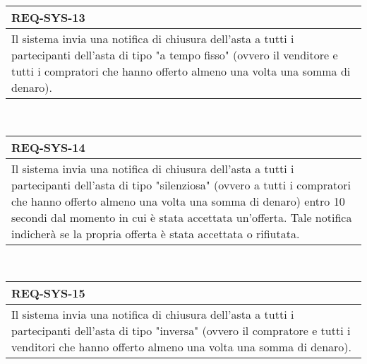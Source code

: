                 \begin{tabular}{|p{}|}
                    \hline
                    \multicolumn{1}{|l|}{\cellcolor{head}\textbf{REQ-SYS-13}} \\
                    \hline
                    Il sistema invia una notifica di chiusura dell'asta a tutti i partecipanti dell'asta di tipo "a tempo fisso" (ovvero il venditore e tutti i compratori che hanno offerto almeno una volta una somma di denaro). \\
                    \hline
                \end{tabular} \smallskip \\
                \begin{tabular}{|p{}|}
                    \hline
                    \multicolumn{1}{|l|}{\cellcolor{head}\textbf{REQ-SYS-14}} \\
                    \hline
                    Il sistema invia una notifica di chiusura dell'asta a tutti i partecipanti dell'asta di tipo "silenziosa" (ovvero a tutti i compratori che hanno offerto almeno una volta una somma di denaro) entro 10 secondi dal momento in cui è stata accettata un'offerta. Tale notifica indicherà se la propria offerta è stata accettata o rifiutata. \\
                    \hline
                \end{tabular} \smallskip \\
                \begin{tabular}{|p{}|}
                    \hline
                    \multicolumn{1}{|l|}{\cellcolor{head}\textbf{REQ-SYS-15}} \\
                    \hline
                    Il sistema invia una notifica di chiusura dell'asta a tutti i partecipanti dell'asta di tipo "inversa" (ovvero il compratore e tutti i venditori che hanno offerto almeno una volta una somma di denaro). \\
                    \hline
                \end{tabular} \smallskip \\
        
